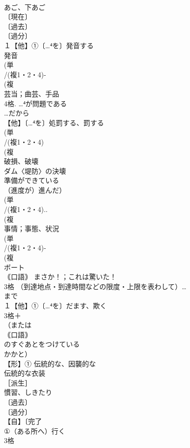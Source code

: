 \documentclass[8pt]{extreport}
\begin{document}
\begin{CJK}{UTF8}{min}
\\	あご、下あご 
\\	〔現在〕
\\	〔過去〕
\\	〔過分〕
\\	１【他】①〔…⁴を〕発音する 
\\	発音
\\	(単
\\	/(複1・2・4)-
\\	(複
\\	芸当；曲芸、手品 
\\	4格.	…⁴が問題である
\\	…だから
\\	【他】〔…⁴を〕処罰する、罰する 
\\	(単
\\	/(複1・2・4)
\\	(複
\\	破損、破壊 
\\	ダム〈堤防〉の決壊 
\\	準備ができている 
\\	（進度が）進んだ）
\\	(単
\\	/(複1・2・4)..
\\	(複
\\	事情；事態、状況
\\	(単
\\	/(複1・2・4)-
\\	(複
\\	ボート 
\\	｟口語｠ まさか！；これは驚いた！
\\	3格	（到達地点・到達時間などの限度・上限を表わして）…
\\	まで
\\	１【他】①〔…⁴を〕だます、欺く 
\\	3格＋
\\	（または
\\	｟口語｠ 
\\	のすぐあとをつけている 
\\	かかと）
\\	【形】① 伝統的な、因襲的な 
\\	伝統的な衣装 
\\	［派生］ 
\\	慣習、しきたり
\\	〔過去〕
\\	〔過分〕
\\	【自】〔完了
\\	①（ある所へ）行く
\\	3格 

\end{CJK}
\end{document}

